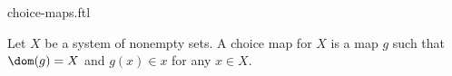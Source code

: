 \documentclass{naproche-library}
\begin{document}
\begin{smodule}[title=Choice Maps]{choice-maps.ftl}

\begin{definition*}[forthel,id=FOUNDATIONS_10_1352015487625913]
  Let $X$ be a system of nonempty sets.
  A choice map for $X$ is a map $g$ such that $\dom(g) = X$ and $g(x) \in x$ for any $x \in X$.
\end{definition*}
\end{smodule}
\end{document}
